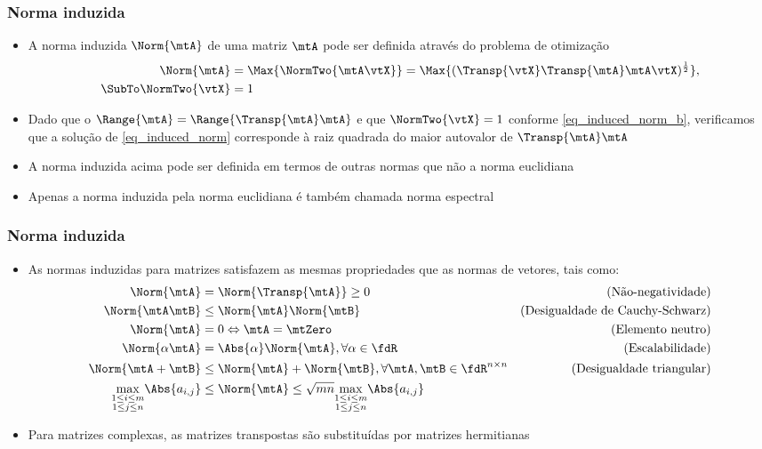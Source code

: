 \begin{frame}
  \frametitle{Norma induzida}
  \begin{itemize}
    \item A {\alert{norma induzida}} $\Norm{\mtA}$ de uma matriz $\mtA$ pode ser definida através do problema de otimização
    \begin{subequations}\label{eq_induced_norm}
      \begin{align}
        \Norm{\mtA} &= \Max{\NormTwo{\mtA\vtX}} = \Max{(\Transp{\vtX}\Transp{\mtA}\mtA\vtX)^{\frac{1}{2}}}, \label{eq_induced_norm_a} \\
        \SubTo \NormTwo{\vtX} &= 1 \label{eq_induced_norm_b}
      \end{align}
    \end{subequations}
    \item Dado que o $\Range{\mtA} = \Range{\Transp{\mtA}\mtA}$ e que $\NormTwo{\vtX} = 1$ conforme \eqref{eq_induced_norm_b}, verificamos que a solução de \eqref{eq_induced_norm} corresponde à raiz quadrada do maior autovalor de $\Transp{\mtA}\mtA$
    \item A norma induzida acima pode ser definida em termos de outras normas que não a norma euclidiana
    \item Apenas a norma induzida pela norma euclidiana é também chamada {\alert{norma espectral}}
  \end{itemize}
\end{frame}

\begin{frame}
  \frametitle{Norma induzida}
  \begin{itemize}
    \item As normas induzidas para matrizes satisfazem as mesmas propriedades que as normas de vetores, tais como:
    \begin{subequations}
      \begin{align}
        \Norm{\mtA} &= \Norm{\Transp{\mtA}} \geq 0 & \text{(Não-negatividade)}\\
        \Norm{\mtA\mtB} &\leq \Norm{\mtA}\Norm{\mtB} & \text{(Desigualdade de Cauchy-Schwarz)} \\
        \Norm{\mtA} &= 0 \Leftrightarrow \mtA = \mtZero & \text{(Elemento neutro)} \\
        \Norm{\alpha\mtA} &= \Abs{\alpha}\Norm{\mtA}, \forall \alpha \in \fdR & \text{(Escalabilidade)} \\
        \Norm{\mtA + \mtB} &\leq \Norm{\mtA} + \Norm{\mtB}, \forall \mtA, \mtB \in \fdR^{n\times n} & \text{(Desigualdade triangular)} \\
        \underset{\substack{1 \leq i \leq m \\ 1 \leq j \leq n}}{\max} \Abs{a_{i,j}} &\leq \Norm{\mtA} \leq \sqrt{mn} \underset{\substack{1 \leq i \leq m \\ 1 \leq j \leq n}}{\max}\Abs{a_{i,j}}
      \end{align}
    \end{subequations}
    \item Para matrizes complexas, as matrizes transpostas são substituídas por matrizes hermitianas
  \end{itemize}
\end{frame}

